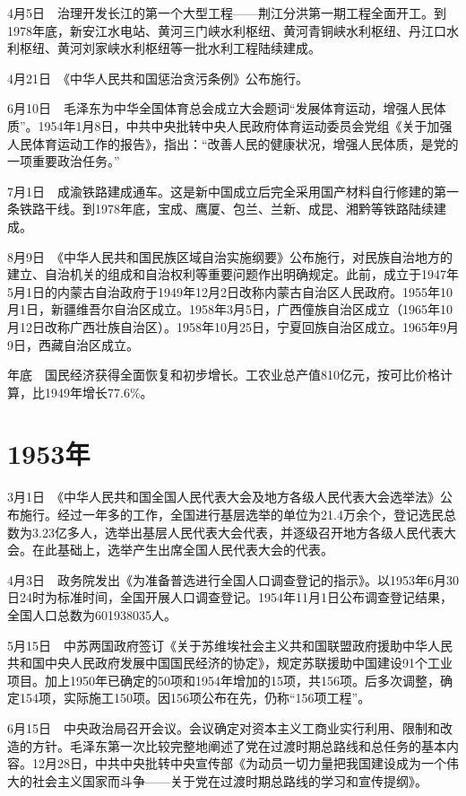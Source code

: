 \documentclass[10pt,a4paper,twocolumn]{book}
\begin{document}
4月5日　治理开发长江的第一个大型工程——荆江分洪第一期工程全面开工。到1978年底，新安江水电站、黄河三门峡水利枢纽、黄河青铜峡水利枢纽、丹江口水利枢纽、黄河刘家峡水利枢纽等一批水利工程陆续建成。

4月21日　《中华人民共和国惩治贪污条例》公布施行。

6月10日　毛泽东为中华全国体育总会成立大会题词“发展体育运动，增强人民体质”。1954年1月8日，中共中央批转中央人民政府体育运动委员会党组《关于加强人民体育运动工作的报告》，指出：“改善人民的健康状况，增强人民体质，是党的一项重要政治任务。”

7月1日　成渝铁路建成通车。这是新中国成立后完全采用国产材料自行修建的第一条铁路干线。到1978年底，宝成、鹰厦、包兰、兰新、成昆、湘黔等铁路陆续建成。

8月9日　《中华人民共和国民族区域自治实施纲要》公布施行，对民族自治地方的建立、自治机关的组成和自治权利等重要问题作出明确规定。此前，成立于1947年5月1日的内蒙古自治政府于1949年12月2日改称内蒙古自治区人民政府。1955年10月1日，新疆维吾尔自治区成立。1958年3月5日，广西僮族自治区成立（1965年10月12日改称广西壮族自治区）。1958年10月25日，宁夏回族自治区成立。1965年9月9日，西藏自治区成立。

年底　国民经济获得全面恢复和初步增长。工农业总产值810亿元，按可比价格计算，比1949年增长77.6\%。

\section{1953年}

3月1日　《中华人民共和国全国人民代表大会及地方各级人民代表大会选举法》公布施行。经过一年多的工作，全国进行基层选举的单位为21.4万余个，登记选民总数为3.23亿多人，选举出基层人民代表大会代表，并逐级召开地方各级人民代表大会。在此基础上，选举产生出席全国人民代表大会的代表。

4月3日　政务院发出《为准备普选进行全国人口调查登记的指示》。以1953年6月30日24时为标准时间，全国开展人口调查登记。1954年11月1日公布调查登记结果，全国人口总数为601938035人。

5月15日　中苏两国政府签订《关于苏维埃社会主义共和国联盟政府援助中华人民共和国中央人民政府发展中国国民经济的协定》，规定苏联援助中国建设91个工业项目。加上1950年已确定的50项和1954年增加的15项，共156项。后多次调整，确定154项，实际施工150项。因156项公布在先，仍称“156项工程”。

6月15日　中央政治局召开会议。会议确定对资本主义工商业实行利用、限制和改造的方针。毛泽东第一次比较完整地阐述了党在过渡时期总路线和总任务的基本内容。12月28日，中共中央批转中央宣传部《为动员一切力量把我国建设成为一个伟大的社会主义国家而斗争——关于党在过渡时期总路线的学习和宣传提纲》。
\end{document}
